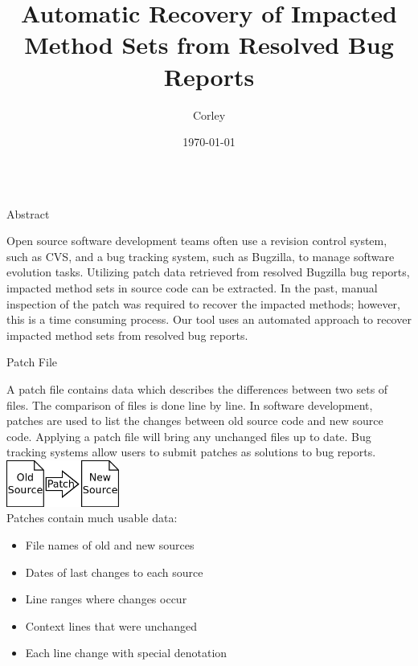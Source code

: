 \documentclass[final]{beamer}
\title{Automatic Recovery of Impacted Method Sets from Resolved Bug Reports}
\author[Corley]{Corley}
\institute[The University of Alabama]{Department of Computer Science, The University of Alabama}
\date{\today}
\begin{document}
\begin{frame}{}
    \begin{columns}[t]
        \begin{column}{.32\linewidth}


            \begin{block}{\large\sc Abstract}
                \vspace*{-0.25em}
                \centering
                \begin{minipage}[t]{0.95\linewidth}
\justifying
\large
Open source software development teams often use a revision control system,
such as CVS, and a bug tracking system, such as Bugzilla, to manage software
evolution tasks.
Utilizing patch data retrieved from resolved Bugzilla bug reports, impacted method sets in source code can be extracted.
\baselineskip
In the past, manual inspection of the patch was required to recover the impacted methods; however, this is a time consuming process.
Our tool uses an automated approach to recover impacted method sets from resolved bug reports.
                \end{minipage}
                \vspace*{-0.5em}
            \end{block}


            \begin{block}{\large\sc Patch File}
                \vspace*{-0.25em}
                \centering
                \begin{minipage}[t]{0.95\linewidth}
\large
\justifying
A patch file contains data which describes the differences between two sets of files.  The comparison of files is done line by line.
In software development, patches are used to list the changes between old source code and new source code.
Applying a patch file will bring any unchanged files up to date.
Bug tracking systems allow users to submit patches as solutions to bug reports.\\
\baselineskip
\centering
\includegraphics[width=10em]{patch}\\
\justifying
Patches contain much usable data:
\begin{itemize}
\item
    File names of old and new sources
\item
    Dates of last changes to each source
\item
    Line ranges where changes occur
\item
    Context lines that were unchanged
\item
    Each line change with special denotation
\end{itemize}


\end{minipage}
\end{block}
\end{column}
\end{columns}
\end{frame}
\end{document}
